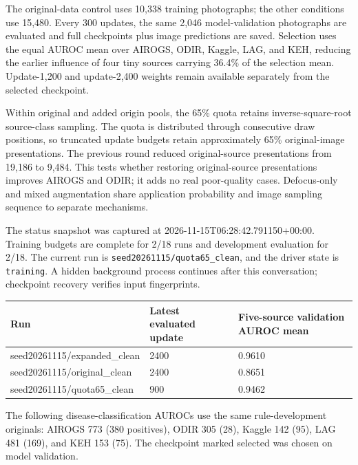 \documentclass[
  10pt,
]{article}
\begin{document}
The original-data control uses 10,338 training photographs; the other
conditions use 15,480. Every 300 updates, the same 2,046
model-validation photographs are evaluated and full checkpoints plus
image predictions are saved. Selection uses the equal AUROC mean over
AIROGS, ODIR, Kaggle, LAG, and KEH, reducing the earlier influence of
four tiny sources carrying 36.4\% of the selection mean. Update-1,200
and update-2,400 weights remain available separately from the selected
checkpoint.

Within original and added origin pools, the 65\% quota retains
inverse-square-root source-class sampling. The quota is distributed
through consecutive draw positions, so truncated update budgets retain
approximately 65\% original-image presentations. The previous round
reduced original-source presentations from 19,186 to 9,484. This tests
whether restoring original-source presentations improves AIROGS and
ODIR; it adds no real poor-quality cases. Defocus-only and mixed
augmentation share application probability and image sampling sequence
to separate mechanisms.

The status snapshot was captured at 2026-11-15T06:28:42.791150+00:00.
Training budgets are complete for 2/18 runs and development evaluation
for 2/18. The current run is \texttt{seed20261115/quota65\_clean}, and
the driver state is \texttt{training}. A hidden background process
continues after this conversation; checkpoint recovery verifies input
fingerprints.

\begin{longtable}[]{@{}lll@{}}
\toprule\noalign{}
Run & Latest evaluated update & Five-source validation AUROC mean \\
\midrule\noalign{}
\endhead
\bottomrule\noalign{}
\endlastfoot
seed20261115/expanded\_clean & 2400 & 0.9610 \\
seed20261115/original\_clean & 2400 & 0.8651 \\
seed20261115/quota65\_clean & 900 & 0.9462 \\
\end{longtable}

The following disease-classification AUROCs use the same
rule-development originals: AIROGS 773 (380 positives), ODIR 305 (28),
Kaggle 142 (95), LAG 481 (169), and KEH 153 (75). The checkpoint marked
selected was chosen on model validation.
\end{document}
